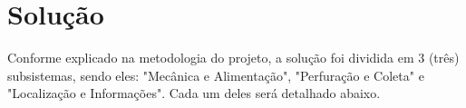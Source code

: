 \chapter{Solução}

Conforme explicado na metodologia do projeto, a solução foi dividida em 3 (três) subsistemas, sendo eles: "Mecânica e Alimentação", "Perfuração e Coleta" e "Localização e Informações".
Cada um deles será detalhado abaixo.


\vfill
\pagebreak


\vfill
\pagebreak


\vfill
\pagebreak
